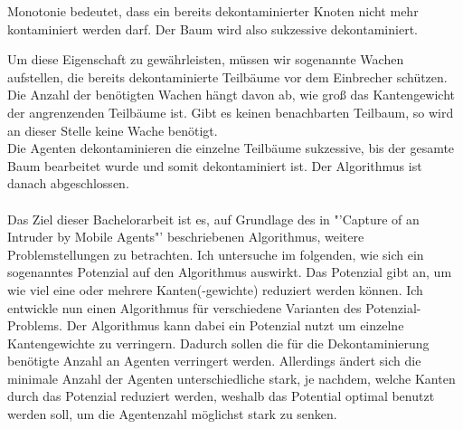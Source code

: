 \begin{mydef}\label{def_monotonie}
	Monotonie bedeutet, dass ein bereits dekontaminierter Knoten nicht mehr kontaminiert werden darf. Der Baum wird also sukzessive dekontaminiert. 
\end{mydef}
 Um diese Eigenschaft zu gewährleisten, müssen wir sogenannte Wachen aufstellen, die bereits dekontaminierte Teilbäume vor dem Einbrecher schützen. Die Anzahl der benötigten Wachen hängt davon ab, wie groß das Kantengewicht der angrenzenden Teilbäume ist. Gibt es keinen benachbarten Teilbaum, so wird an dieser Stelle keine Wache benötigt.\\
Die Agenten dekontaminieren die einzelne Teilbäume sukzessive, bis der gesamte Baum bearbeitet wurde und somit dekontaminiert ist. Der Algorithmus ist danach abgeschlossen.
\\
\\
Das Ziel dieser Bachelorarbeit ist es, auf Grundlage des in "'Capture of an Intruder by Mobile Agents"' \cite{cima_paper} beschriebenen Algorithmus, weitere Problemstellungen zu betrachten. Ich untersuche im folgenden, wie sich ein sogenanntes Potenzial auf den Algorithmus auswirkt. Das Potenzial gibt an, um wie viel eine oder mehrere Kanten(-gewichte) reduziert werden können. Ich entwickle nun einen Algorithmus für verschiedene Varianten des Potenzial-Problems. Der Algorithmus kann dabei ein Potenzial nutzt um einzelne Kantengewichte zu verringern. Dadurch sollen die für die Dekontaminierung benötigte Anzahl an Agenten verringert werden. Allerdings ändert sich die minimale Anzahl der Agenten unterschiedliche stark, je nachdem, welche Kanten durch das Potenzial reduziert werden, weshalb das Potential optimal benutzt werden soll, um die Agentenzahl möglichst stark zu senken.
\\

